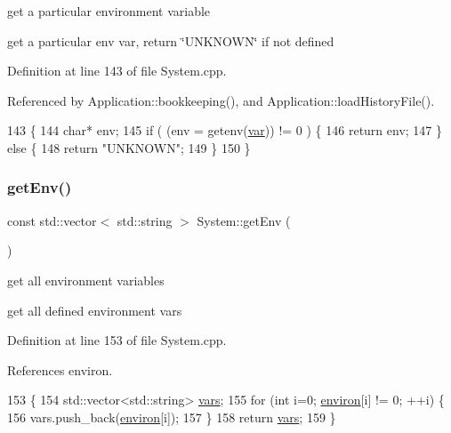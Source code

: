 get a particular environment variable 

get a particular env var, return \char`\"{}\+U\+N\+K\+N\+O\+W\+N\char`\"{} if not defined 

Definition at line 143 of file System.\+cpp.



Referenced by Application\+::bookkeeping(), and Application\+::load\+History\+File().


\begin{DoxyCode}
143                                               \{
144   \textcolor{keywordtype}{char}* env;
145   \textcolor{keywordflow}{if}  ( (env = getenv(\hyperlink{classvar}{var})) != 0 ) \{
146     \textcolor{keywordflow}{return} env;
147   \} \textcolor{keywordflow}{else} \{
148     \textcolor{keywordflow}{return} \textcolor{stringliteral}{"UNKNOWN"};
149   \}
150 \}
\end{DoxyCode}
\mbox{\label{namespaceSystem_a072d542bc6ae51093df9c93db06f4e2d}} 
\subsubsection{\texorpdfstring{get\+Env()}{getEnv()}\hspace{0.1cm}{\footnotesize\ttfamily [2/2]}}
{\footnotesize\ttfamily const std\+::vector$<$ std\+::string $>$ System\+::get\+Env (\begin{DoxyParamCaption}{ }\end{DoxyParamCaption})}



get all environment variables 

get all defined environment vars 

Definition at line 153 of file System.\+cpp.



References environ.


\begin{DoxyCode}
153                                           \{
154   std::vector<std::string> \hyperlink{var_8h_a2a1c35ad624b5ab1fedf9a5719b81b4e}{vars};
155   \textcolor{keywordflow}{for} (\textcolor{keywordtype}{int} i=0; \hyperlink{System_8cpp_aa006daaf11f1e2e45a6ababaf463212b}{environ}[i] != 0; ++i) \{
156     vars.push\_back(\hyperlink{System_8cpp_aa006daaf11f1e2e45a6ababaf463212b}{environ}[i]);
157   \}
158   \textcolor{keywordflow}{return} \hyperlink{var_8h_a2a1c35ad624b5ab1fedf9a5719b81b4e}{vars};
159 \}
\end{DoxyCode}
\mbox{\label{namespaceSystem_a89320a729880098922e8b505db1137ec}} 
